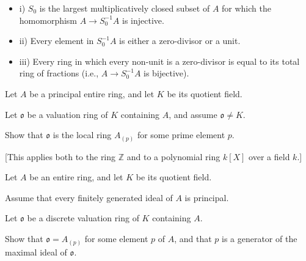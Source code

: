 \begin{itemize}
    \item i) $S_0$ is the largest multiplicatively closed subset of $A$ for which the homomorphism $A \rightarrow S_0^{-1} A$ is injective.

    \item ii) Every element in $S_0^{-1} A$ is either a zero-divisor or a unit.

    \item iii) Every ring in which every non-unit is a zero-divisor is equal to its total ring of fractions (i.e., $A \rightarrow S_0^{-1} A$ is bijective).
\end{itemize}


Let $A$ be a principal entire ring, and let $K$ be its quotient field.

Let $\mathfrak{o}$ be a valuation ring of $K$ containing $A$, and assume $\mathfrak{o} \neq K$.

Show that $\mathfrak{o}$ is the local ring $A_{(p)}$ for some prime element $p$.

[This applies both to the ring $\mathbb{Z}$ and to a polynomial ring $k[X]$ over a field $k$.]


Let $A$ be an entire ring, and let $K$ be its quotient field.

Assume that every finitely generated ideal of $A$ is principal.

Let $\mathfrak{o}$ be a discrete valuation ring of $K$ containing $A$.

Show that $\mathfrak{o}=A_{(p)}$ for some element $p$ of $A$, and that $p$ is a generator of the maximal ideal of $\mathfrak{o}$.
